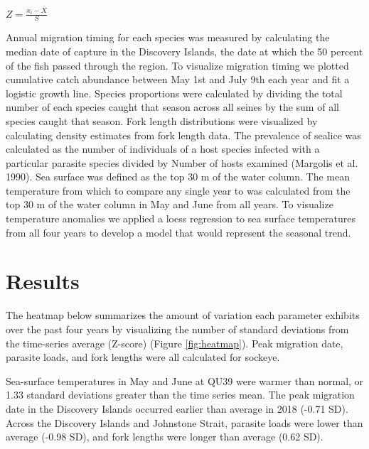 \documentclass[fleqn,10pt]{wlpeerj} %
\begin{document}
\(Z = {\frac{x_i - \bar X}{{S}}}\)

Annual migration timing for each species was measured by calculating the
median date of capture in the Discovery Islands, the date at which the
50 percent of the fish passed through the region. To visualize migration
timing we plotted cumulative catch abundance between May 1st and July
9th each year and fit a logistic growth line. Species proportions were
calculated by dividing the total number of each species caught that
season across all seines by the sum of all species caught that season.
Fork length distributions were visualized by calculating density
estimates from fork length data. The prevalence of sealice was
calculated as the number of individuals of a host species infected with
a particular parasite species divided by Number of hosts examined
(Margolis et al. 1990). Sea surface was defined as the top 30 m of the
water column. The mean temperature from which to compare any single year
to was calculated from the top 30 m of the water column in May and June
from all years. To visualize temperature anomalies we applied a loess
regression to sea surface temperatures from all four years to develop a
model that would represent the seasonal trend.

\section*{Results}\label{results}

The heatmap below summarizes the amount of variation each parameter
exhibits over the past four years by visualizing the number of standard
deviations from the time-series average (Z-score) (Figure
\ref{fig:heatmap}). Peak migration date, parasite loads, and fork
lengths were all calculated for sockeye.

Sea-surface temperatures in May and June at QU39 were warmer than
normal, or 1.33 standard deviations greater than the time series mean.
The peak migration date in the Discovery Islands occurred earlier than
average in 2018 (-0.71 SD). Across the Discovery Islands and Johnstone
Strait, parasite loads were lower than average (-0.98 SD), and fork
lengths were longer than average (0.62 SD).
\end{document}
